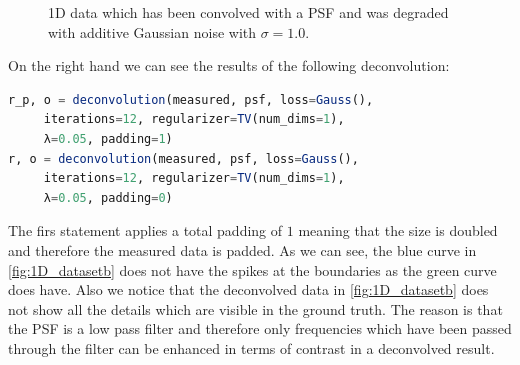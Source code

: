 \documentclass{juliacon}
\begin{document}
\begin{figure}[h]
\begin{subfigure}[b]{.25\textwidth}
                \caption{}
                \label{fig:1D_datasetb}
            \end{subfigure}
            \caption{1D data which has been convolved with a PSF and was degraded with additive Gaussian noise with $\sigma=1.0$.}
            \label{fig:1D_dataset}
        \end{figure}
        On the right hand we can see the results of the following deconvolution:
        \begin{lstlisting}[language=Julia]
r_p, o = deconvolution(measured, psf, loss=Gauss(),
     iterations=12, regularizer=TV(num_dims=1),
     λ=0.05, padding=1)
r, o = deconvolution(measured, psf, loss=Gauss(), 
     iterations=12, regularizer=TV(num_dims=1),
     λ=0.05, padding=0)
        \end{lstlisting}
    The firs statement applies a total padding of $1$ meaning that the size is doubled and therefore the measured data is padded.
    As we can see, the blue curve in \autoref{fig:1D_datasetb} does not have the spikes at the boundaries as the green curve does have.
    Also we notice that the deconvolved data in \autoref{fig:1D_datasetb} does not show all the details which are visible in the ground truth.
    The reason is that the PSF is a low pass filter and therefore only frequencies which have been passed through the filter 
    can be enhanced in terms of contrast in a deconvolved result.
\end{document}
